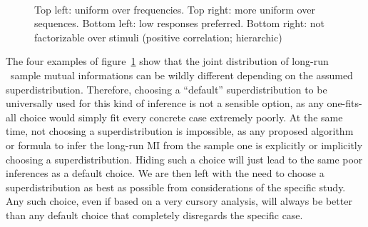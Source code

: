 \begin{figure}[p]
	\\%
	\caption{Top left: uniform over frequencies. Top right: more uniform over
		sequences. Bottom left: low responses preferred. Bottom right: not
		factorizable over stimuli (positive correlation;
		hierarchic)}\label{fig:superdistributions}
\end{figure}%



The four examples of figure~\ref{fig:superdistributions} show that the joint distribution of long-run \amp\ sample mutual informations can be wildly different depending on the assumed superdistribution. Therefore, choosing a \enquote{default} superdistribution to be universally used for this kind of inference \citep[\cf][]{nemenmanetal2004} is not a sensible option, as any one-fits-all choice would simply fit every concrete case extremely poorly. At the same time, not choosing a superdistribution is impossible, as any proposed algorithm or formula to infer the long-run MI from the sample one is explicitly or implicitly choosing a superdistribution. Hiding such a choice will just lead to the same poor inferences as a default choice. We are then left with the need to choose a superdistribution as best as possible from considerations of the specific study. Any such choice, even if based on a very cursory analysis, will always be better than any default choice that completely disregards the specific case.


